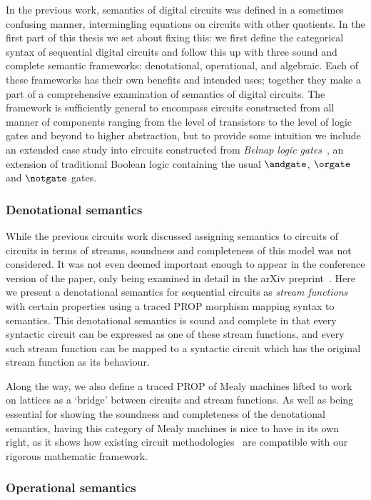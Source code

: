 In the previous work, semantics of digital circuits was defined in a sometimes
confusing manner, intermingling equations on circuits with other quotients.
In the first part of this thesis we set about fixing this: we first define the
categorical syntax of sequential digital circuits and follow this up with three
sound and complete semantic frameworks: denotational, operational, and
algebraic.
Each of these frameworks has their own benefits and intended uses; together they
make a part of a comprehensive examination of semantics of digital circuits.
The framework is sufficiently general to encompass circuits constructed from
all manner of components ranging from the level of transistors to the level of
logic gates and beyond to higher abstraction, but to provide some intuition we
include an extended case study into circuits constructed from
\emph{Belnap logic gates}~\cite{belnap1977useful}, an extension of traditional
Boolean logic containing the usual \(\andgate\), \(\orgate\) and \(\notgate\)
gates.

\subsubsection{Denotational semantics}

While the previous circuits work discussed assigning semantics to circuits
of circuits in terms of streams, soundness and completeness of this model was
not considered.
It was not even deemed important enough to appear in the conference version of
the paper, only being examined in detail in the arXiv
preprint~\cite{ghica2017diagrammatica}.
Here we present a denotational semantics for sequential circuits as
\emph{stream functions} with certain properties using a traced PROP morphism
mapping syntax to semantics.
This denotational semantics is sound and complete in that every syntactic
circuit can be expressed as one of these stream functions, and every such stream
function can be mapped to a syntactic circuit which has the original stream
function as its behaviour.

Along the way, we also define a traced PROP of Mealy machines lifted to work on
lattices as a `bridge' between circuits and stream functions.
As well as being essential for showing the soundness and completeness of the
denotational semantics, having this category of Mealy machines is nice to have
in its own right, as it shows how existing circuit
methodologies~\cite{kohavi2009switching} are compatible with our rigorous
mathematic framework.

\subsubsection{Operational semantics}

